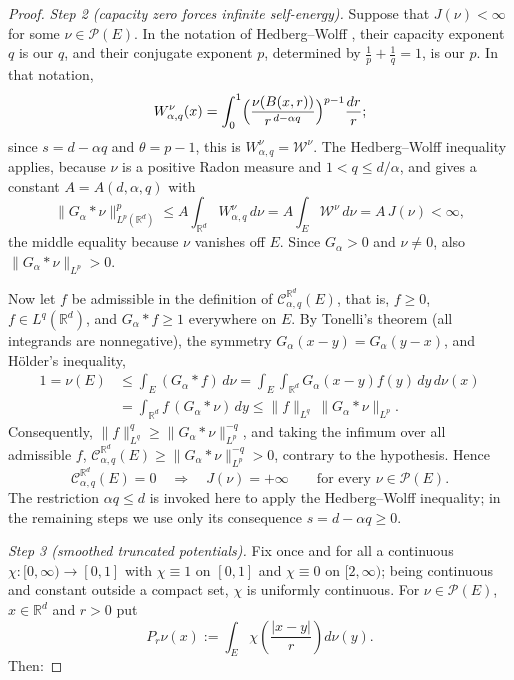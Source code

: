 \documentclass[12pt,oneside,a4paper]{article}
\theoremstyle{mytheorem}
\theoremstyle{remark}
\theoremstyle{definition}
\begin{document}
\begin{proof}
\smallskip\noindent\emph{Step 2 (capacity zero forces infinite
self-energy).}
Suppose that $J(\nu)<\infty$ for some $\nu\in\mathcal{P}(E)$.  In the
notation of Hedberg--Wolff
\cite[pp.~161, 164]{zbMATH03801897}, their capacity exponent $q$ is
our $q$, and their conjugate exponent $p$, determined by
$\frac1p+\frac1q=1$, is our $p$.  In that notation,
\[
 W^{\nu}_{\alpha,q}(x)
 =\int_0^1\Bigl(\frac{\nu(B(x,r))}{r^{\,d-\alpha q}}\Bigr)^{p-1}\frac{dr}{r};
\]
since $s=d-\alpha q$ and $\theta=p-1$, this is $W^{\nu}_{\alpha,q}=\mathcal{W}^\nu$.
The Hedberg--Wolff inequality \cite[Theorem~1, p.~165]{zbMATH03801897}
applies, because $\nu$ is a
positive Radon measure and $1<q\le d/\alpha$, and gives a constant
$A=A(d,\alpha,q)$ with
\[
 \|G_\alpha*\nu\|_{L^p(\mathbb{R}^d)}^{p}
 \le A\int_{\mathbb{R}^d}W^{\nu}_{\alpha,q}\,d\nu
 =A\int_E\mathcal{W}^\nu\,d\nu
 =A\,J(\nu)<\infty,
\]
the middle equality because $\nu$ vanishes off $E$.  Since $G_\alpha>0$
and $\nu\neq0$, also $\|G_\alpha*\nu\|_{L^p}>0$.

Now let $f$ be admissible in the definition of
$\mathcal{C}_{\alpha,q}^{\mathbb R^d}(E)$, that is, $f\ge0$, $f\in L^q(\mathbb{R}^d)$,
and $G_\alpha*f\ge1$ everywhere on $E$.  By Tonelli's theorem (all
integrands are nonnegative), the symmetry $G_\alpha(x-y)=G_\alpha(y-x)$,
and H\"older's inequality,
\[
\begin{aligned}
1=\nu(E)
&\le \int_E(G_\alpha*f)\,d\nu
 =\int_E\int_{\mathbb R^d}G_\alpha(x-y)f(y)\,dy\,d\nu(x)\\
&=\int_{\mathbb R^d}f\,(G_\alpha*\nu)\,dy
 \le \|f\|_{L^q}\,\|G_\alpha*\nu\|_{L^p}.
\end{aligned}
\]
Consequently, $\|f\|_{L^q}^q\ge\|G_\alpha*\nu\|_{L^p}^{-q}$, and taking
the infimum over all admissible $f$,
\(\mathcal{C}_{\alpha,q}^{\mathbb R^d}(E)\ge\|G_\alpha*\nu\|_{L^p}^{-q}>0\),
contrary to the hypothesis.  Hence
\begin{equation}
 \mathcal{C}_{\alpha,q}^{\mathbb R^d}(E)=0
 \quad\Longrightarrow\quad
 J(\nu)=+\infty\qquad\text{for every }\nu\in\mathcal{P}(E).
 \label{eq:B-all-energies}
\end{equation}
The restriction $\alpha q\le d$ is invoked here to apply the
Hedberg--Wolff inequality; in the remaining steps we use only its
consequence $s=d-\alpha q\ge0$.


\smallskip\noindent\emph{Step 3 (smoothed truncated potentials).}
Fix once and for all a continuous $\chi:[0,\infty)\to[0,1]$ with
$\chi\equiv1$ on $[0,1]$ and $\chi\equiv0$ on $[2,\infty)$; being
continuous and constant outside a compact set, $\chi$ is uniformly
continuous.  For $\nu\in\mathcal{P}(E)$, $x\in\mathbb{R}^d$ and $r>0$
put
\[
 P_r\nu(x):=\int_E\chi\!\left(\frac{|x-y|}{r}\right)d\nu(y).
\]
Then:


\end{proof}
\end{document}
